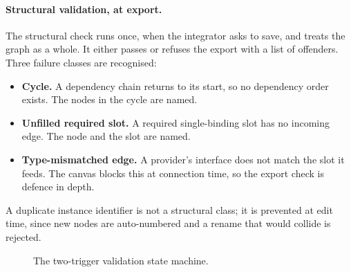 \paragraph{Structural validation, at export.}
The structural check runs once, when the integrator asks to save, and treats the graph as a whole. It either passes or refuses the export with a list of offenders. Three failure classes are recognised:

\begin{itemize}
    \item \textbf{Cycle.} A dependency chain returns to its start, so no dependency order exists. The nodes in the cycle are named.
    \item \textbf{Unfilled required slot.} A required single-binding slot has no incoming edge. The node and the slot are named.
    \item \textbf{Type-mismatched edge.} A provider's interface does not match the slot it feeds. The canvas blocks this at connection time, so the export check is defence in depth.
\end{itemize}

A duplicate instance identifier is not a structural class; it is prevented at edit time, since new nodes are auto-numbered and a rename that would collide is rejected.

\begin{figure}[H]
    \centering
    \resizebox{0.9\textwidth}{!}{
        
    }
    \caption[The two-trigger validation state machine.]{The two-trigger validation state machine.}
    \label{fig:validation-outcome}
\end{figure}

\FloatBarrier

